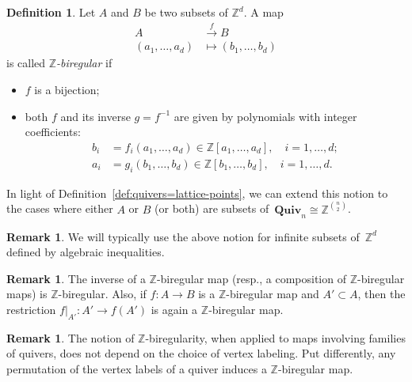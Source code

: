 \documentclass[11pt, letterpaper]{amsart}
\theoremstyle{definition}
\newtheorem{remark}[theorem]{Remark}
\newtheorem{definition}[theorem]{Definition}
\numberwithin{equation}{section}
\def\ZZ{{\mathbb Z}}
\def\Quiv {{\mathbf{Quiv}}}
\begin{document}
\begin{definition}
\label{def:z-biregular}
Let $A$ and $B$ be two subsets of $\ZZ^d$. 
A map 
\vspace{-5pt}
\begin{align*}
A&\stackrel{f}{\to} B \\[-3pt]
(a_1,\dots,a_d)&\mapsto (b_1,\dots,b_d) 
\end{align*}
is called \emph{$\ZZ$-biregular} if 
\begin{itemize}[leftmargin=.2in]
\item 
$f$ is a bijection; 
\item
both $f$ and its inverse  $g=f^{-1}$ are given by polynomials with integer coefficients: 
\begin{align*}
b_i&=f_i(a_1,\dots,a_d)\in\ZZ[a_1,\dots,a_d], \quad i=1,\dots, d; \\
a_i&=g_i(b_1,\dots,b_d)\in\ZZ[b_1,\dots,b_d], \quad i=1,\dots, d. 
\end{align*}
\end{itemize}
In light of Definition~\ref{def:quivers=lattice-points}, we can extend this notion to the cases where
either $A$ or $B$ (or both) are subsets of~$\Quiv_n\cong \ZZ^{\binom{n}{2}}$.  %
\end{definition}

\begin{remark}
We will typically use the above notion for infinite subsets of~$\ZZ^d$ defined by algebraic inequalities. 
\end{remark}

\begin{remark}
The inverse of a $\ZZ$-biregular map (resp., a composition of $\ZZ$-biregular maps) is $\ZZ$-biregular. 
Also, if $f:A\to B$ is a $\ZZ$-biregular map and $A'\subset A$, then the restriction $f|_{A'}:A'\to f(A')$ 
is again a $\ZZ$-biregular map. 
\end{remark}

\begin{remark}
\label{rem:relabeling-regular}
The notion of $\ZZ$-biregularity, when applied to maps involving families of quivers, does not depend on the choice of vertex labeling. 
Put differently, any permutation of the vertex labels of a quiver induces a $\ZZ$-biregular map. 
\end{remark}
\end{document}
